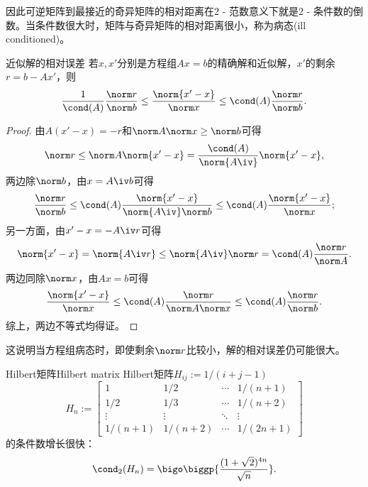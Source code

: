 \begin{remark}
    因此可逆矩阵到最接近的奇异矩阵的相对距离在2 - 范数意义下就是2 - 条件数的倒数。当条件数很大时，矩阵与奇异矩阵的相对距离很小，称为病态(ill conditioned)。
\end{remark}

\begin{theorem}
    {近似解的相对误差}{}
    若$x,x'$分别是方程组$Ax=b$的精确解和近似解，$x'$的剩余$r=b-Ax'$，则
    \begin{equation}
        \frac1{\cond(A)}\frac{\norm r}{\norm b}\leq\frac{\norm{x'-x}}{\norm x}\leq\cond(A)\frac{\norm r}{\norm b}.
    \end{equation}
\end{theorem}

\begin{proof}
    由$A(x'-x)=-r$和$\norm A\norm x\geq\norm b$可得
    \[
        \norm r\leq\norm A\norm{x'-x}=\frac{\cond(A)}{\norm{A\iv}}\norm{x'-x},
    \]
    两边除$\norm b$，由$x=A\iv b$可得 
    \[
        \frac{\norm r}{\norm b}\leq\cond(A)\frac{\norm{x'-x}}{\norm{A\iv}\norm b}\leq\cond(A)\frac{\norm{x'-x}}{\norm x};
    \]
    另一方面，由$x'-x=-A\iv r$可得
    \[
        \norm{x'-x}=\norm{A\iv r}\leq\norm{A\iv}\norm r=\cond(A)\frac{\norm r}{\norm A}.
    \]
    两边同除$\norm x$，由$Ax=b$可得 
    \[
        \frac{\norm{x'-x}}{\norm x}\leq\cond(A)\frac{\norm r}{\norm A\norm x}\leq\cond(A)\frac{\norm r}{\norm b}.
    \]
    综上，两边不等式均得证。
\end{proof}

\begin{remark}
    这说明当方程组病态时，即使剩余$\norm r$比较小，解的相对误差仍可能很大。
\end{remark}

\begin{example}
    {Hilbert矩阵}{Hilbert matrix}
    Hilbert矩阵$H_{ij}:=1/(i+j-1)$
    \begin{equation*}
        H_n:=\begin{bmatrix}
            1&1/2&\cdots&1/(n+1)\\
            1/2&1/3&\cdots&1/(n+2)\\
            \vdots&\vdots&\ddots&\vdots\\
            1/(n+1)&1/(n+2)&\cdots&1/(2n+1)
        \end{bmatrix}
    \end{equation*}
    的条件数增长很快：
    \[
        \cond_2(H_n)=\bigo\biggp{\frac{(1+\sqrt2)^{4n}}{\sqrt n}}.
    \]
\end{example}

